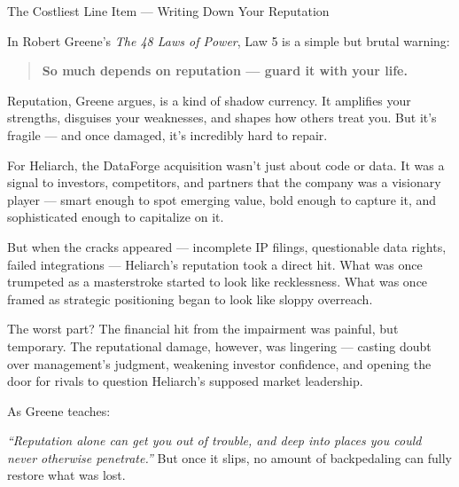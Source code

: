 \begin{HistoricalSidebar}{The Costliest Line Item --- Writing Down Your Reputation}

In Robert Greene’s \textit{The 48 Laws of Power}, Law 5 is a simple but brutal warning:

\begin{quote}
    \textbf{So much depends on reputation — guard it with your life.}
\end{quote}

Reputation, Greene argues, is a kind of shadow currency.  
It amplifies your strengths, disguises your weaknesses, and shapes how others treat you.  
But it’s fragile — and once damaged, it’s incredibly hard to repair.

\medskip

For Heliarch, the DataForge acquisition wasn’t just about code or data.  
It was a signal to investors, competitors, and partners that the company was a visionary player —  
smart enough to spot emerging value, bold enough to capture it, and sophisticated enough to capitalize on it.

\medskip

But when the cracks appeared — incomplete IP filings, questionable data rights, failed integrations —  
Heliarch’s reputation took a direct hit.  
What was once trumpeted as a masterstroke started to look like recklessness.  
What was once framed as strategic positioning began to look like sloppy overreach.

\medskip

The worst part?  
The financial hit from the impairment was painful, but temporary.  
The reputational damage, however, was lingering —  
casting doubt over management’s judgment, weakening investor confidence, and opening the door for rivals to question Heliarch’s supposed market leadership.

\medskip

As Greene teaches:  

\medskip

\textit{“Reputation alone can get you out of trouble, and deep into places you could never otherwise penetrate.”}  
But once it slips, no amount of backpedaling can fully restore what was lost.
\end{HistoricalSidebar}